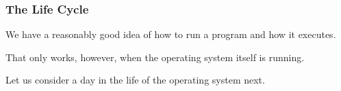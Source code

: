 \begin{frame}
\frametitle{The Life Cycle}

We have a reasonably good idea of how to run a program and how it executes. 

That only works, however, when the operating system itself is running. 
 
Let us consider a day in the life of the operating system next.


\end{frame}





